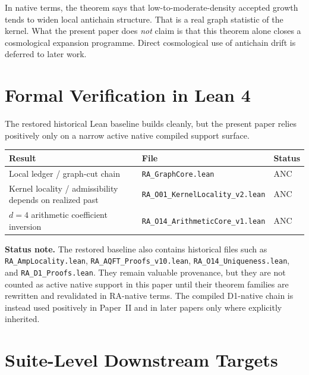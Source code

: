 \documentclass[11pt]{article}
\begin{document}
In native terms, the theorem says that low-to-moderate-density accepted growth tends to widen local antichain structure. That is a real graph statistic of the kernel. What the present paper does \emph{not} claim is that this theorem alone closes a cosmological expansion programme. Direct cosmological use of antichain drift is deferred to later work.

\section{Formal Verification in Lean 4}
\label{sec:lean}

The restored historical Lean baseline builds cleanly, but the present paper relies positively only on a narrow active native compiled support surface.

\begin{center}
\begin{tabular}{lll}
\toprule
Result & File & Status \\
\midrule
Local ledger / graph-cut chain & \texttt{RA\_GraphCore.lean} & ANC \\
Kernel locality / admissibility depends on realized past & \texttt{RA\_O01\_KernelLocality\_v2.lean} & ANC \\
$d=4$ arithmetic coefficient inversion & \texttt{RA\_O14\_ArithmeticCore\_v1.lean} & ANC \\
\bottomrule
\end{tabular}
\end{center}

\noindent\textbf{Status note.} The restored baseline also contains historical files such as \texttt{RA\_AmpLocality.lean}, \texttt{RA\_AQFT\_Proofs\_v10.lean}, \texttt{RA\_O14\_Uniqueness.lean}, and \texttt{RA\_D1\_Proofs.lean}. They remain valuable provenance, but they are not counted as active native support in this paper until their theorem families are rewritten and revalidated in RA-native terms. The compiled D1-native chain is instead used positively in Paper~II and in later papers only where explicitly inherited.

\section{Suite-Level Downstream Targets}
\label{sec:predictions}
\end{document}
